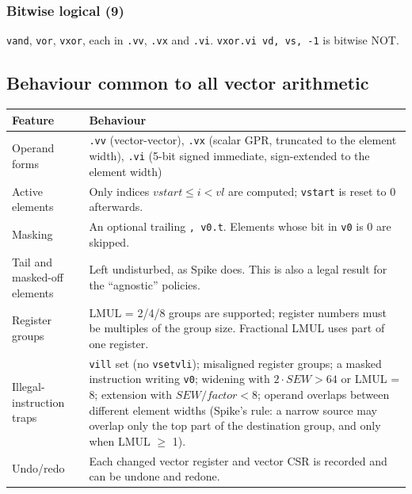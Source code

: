 \documentclass{article}
\begin{document}
\subsubsection*{Bitwise logical (9)}
\texttt{vand}, \texttt{vor}, \texttt{vxor}, each in \texttt{.vv}, \texttt{.vx} and \texttt{.vi}.
\texttt{vxor.vi vd, vs, -1} is bitwise NOT.

\subsection{Behaviour common to all vector arithmetic}
\begin{longtable}{|p{3.5cm}|p{11cm}|}
    \hline
    \textbf{Feature} & \textbf{Behaviour} \\
    \hline
    Operand forms & \texttt{.vv} (vector-vector), \texttt{.vx} (scalar GPR, truncated to the
    element width), \texttt{.vi} (5-bit signed immediate, sign-extended to the element width) \\
    \hline
    Active elements & Only indices $vstart \le i < vl$ are computed; \texttt{vstart} is reset to 0
    afterwards. \\
    \hline
    Masking & An optional trailing \texttt{, v0.t}. Elements whose bit in \texttt{v0} is 0 are
    skipped. \\
    \hline
    Tail and masked-off elements & Left undisturbed, as Spike does. This is also a legal result for
    the ``agnostic'' policies. \\
    \hline
    Register groups & LMUL = 2/4/8 groups are supported; register numbers must be multiples of the
    group size. Fractional LMUL uses part of one register. \\
    \hline
    Illegal-instruction traps & \texttt{vill} set (no \texttt{vsetvli}); misaligned register
    groups; a masked instruction writing \texttt{v0}; widening with $2 \cdot SEW > 64$ or
    LMUL = 8; extension with $SEW/factor < 8$; operand overlaps between different element widths
    (Spike's rule: a narrow source may overlap only the top part of the destination group, and
    only when LMUL $\ge$ 1). \\
    \hline
    Undo/redo & Each changed vector register and vector CSR is recorded and can be undone and
    redone. \\
    \hline
\end{longtable}
\end{document}
